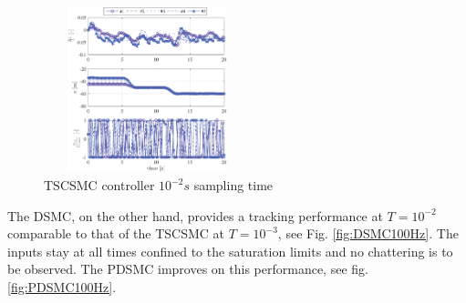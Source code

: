 \documentclass{ifacconf}
\newcommand{\figheight}{4.8cm}
\newcommand{\figwidth}{6cm}
\begin{document}
\begin{figure} [h!]
\begin{center}
\includegraphics[width=\figwidth,height=\figheight]{TSCSMC-100Hz-TIMESCALESEPARATION-turbulence=1}    %
\caption{ TSCSMC controller $10^{-2} s$ sampling time}
\label{fig:CSMC100Hz}
\end{center}
\end{figure}
The DSMC, on the other hand, provides a tracking performance at $T = 10^{-2}$ comparable to that of the TSCSMC at $T = 10^{-3}$, see Fig. \ref{fig:DSMC100Hz}. The inputs stay at all times confined to the saturation limits and no chattering is to be observed. The PDSMC improves on this performance, see fig. \ref{fig:PDSMC100Hz}.
\end{document}
